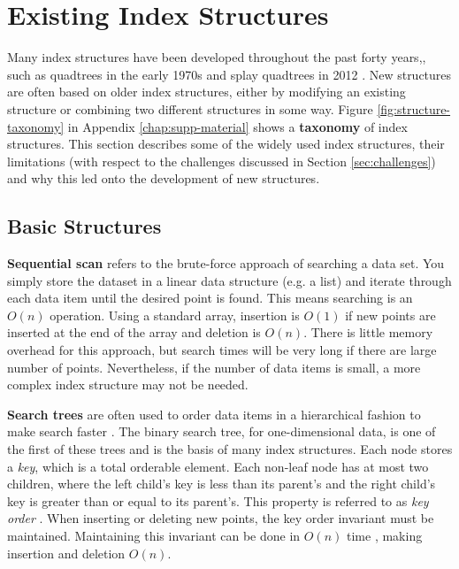 \section{Existing Index Structures}
\label{sec:structures}

Many index structures have been developed throughout the past forty years,, such as quadtrees in the early 1970s \cite{quadtree} and splay quadtrees in 2012 \cite{splay-quadtree}. New structures are often based on older index structures, either by modifying an existing structure or combining two different structures in some way. Figure \ref{fig:structure-taxonomy} in Appendix \ref{chap:supp-material} shows a \textbf{taxonomy} of index structures. This section describes some of the widely used index structures, their limitations (with respect to the challenges discussed in Section \ref{sec:challenges}) and why this led onto the development of new structures.

\subsection{Basic Structures}

\textbf{Sequential scan} refers to the brute-force approach of searching a data set. You simply store the dataset in a linear data structure (e.g. a list) and iterate through each data item until the desired point is found. This means searching is an $O(n)$ operation. Using a standard array, insertion is $O(1)$ if new points are inserted at the end of the array and deletion is $O(n)$. There is little memory overhead for this approach, but search times will be very long if there are large number of points. Nevertheless, if the number of data items is small, a more complex index structure may not be needed.

\textbf{Search trees} are often used to order data items in a hierarchical fashion to make search faster \cite{introduction-to-algorithms}. The binary search tree, for one-dimensional data, is one of the first of these trees and is the basis of many index structures. Each node stores a \textit{key}, which is a total orderable element. Each non-leaf node has at most two children, where the left child's key is less than its parent's and the right child's key is greater than or equal to its parent's. This property is referred to as \textit{key order} \cite{rst}. When inserting or deleting new points, the key order invariant must be maintained. Maintaining this invariant can be done in $O(n)$ time \cite{introduction-to-algorithms}, making insertion and deletion $O(n)$.


